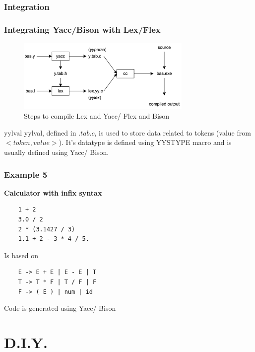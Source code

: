 \documentclass{beamer}
\begin{document}
\subsubsection{Integration}

\begin{frame}
    \frametitle{Integrating Yacc/Bison with Lex/Flex}

    \begin{figure}
        \centering
        \includegraphics[width=0.75\textwidth]{imgs/yacc.png}
        \caption{Steps to compile Lex and Yacc/ Flex and Bison}
        \label{fig:yacc}
    \end{figure}
    
    \begin{alertblock}{yylval}
        yylval, defined in $.tab.c$, is used to store data related to tokens (value from $<token, value>$).
        It's datatype is defined using YYSTYPE macro and is usually defined using Yacc/ Bison.
    \end{alertblock}
\end{frame}

\begin{frame}[fragile]
    \frametitle{Example 5}
    
    \textbf{Calculator with infix syntax}
    
    \begin{lstlisting}
    1 + 2
    3.0 / 2
    2 * (3.1427 / 3)
    1.1 + 2 - 3 * 4 / 5.
    \end{lstlisting}
    
    Is based on
    \begin{lstlisting}
    E -> E + E | E - E | T
    T -> T * F | T / F | F
    F -> ( E ) | num | id
    \end{lstlisting}
    
    Code is generated using Yacc/ Bison
\end{frame}

\section{D.I.Y.}
\end{document}

